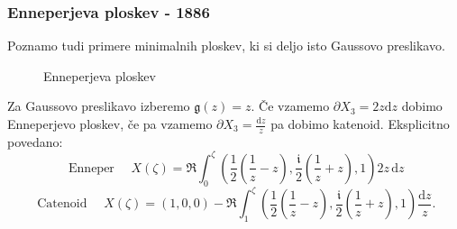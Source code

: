 \documentclass[8pt]{beamer}
\newcommand{\samplescalar}{50} %
\theoremstyle{definition}
\theoremstyle{remark}
\theoremstyle{plain}
\numberwithin{equation}{section}  %
\begin{document}
\begin{frame}
    \frametitle{Enneperjeva ploskev - 1886}

    Poznamo tudi primere minimalnih ploskev, ki si deljo isto Gaussovo preslikavo. 

    \begin{figure}[H]
        \centering

        \caption{Enneperjeva ploskev}
    \end{figure}

    Za Gaussovo preslikavo izberemo $\mathfrak{g}(z)=z$. Če vzamemo $\partial X_3=2 z \mathrm{d} z$ dobimo Enneperjevo ploskev, če pa vzamemo $\partial X_3=\frac{\mathrm{d} z}{z}$ pa dobimo katenoid. Eksplicitno povedano: 
    \begin{equation*}
        \text { Enneper } \quad X(\zeta)=\Re \int_0^\zeta\left(\frac{1}{2}\left(\frac{1}{z}-z\right), \frac{\mathfrak{i}}{2}\left(\frac{1}{z}+z\right), 1\right) 2 z \, \mathrm{d} z
    \end{equation*}  
    \begin{equation*}
        \text { Catenoid } \quad X(\zeta)=(1,0,0)-\Re \int_1^\zeta\left(\frac{1}{2}\left(\frac{1}{z} - z\right), \frac{\mathfrak{i}}{2}\left(\frac{1}{z}+z\right), 1\right) \frac{\mathrm{d} z}{z} .
    \end{equation*}
\end{frame}
\end{document}

